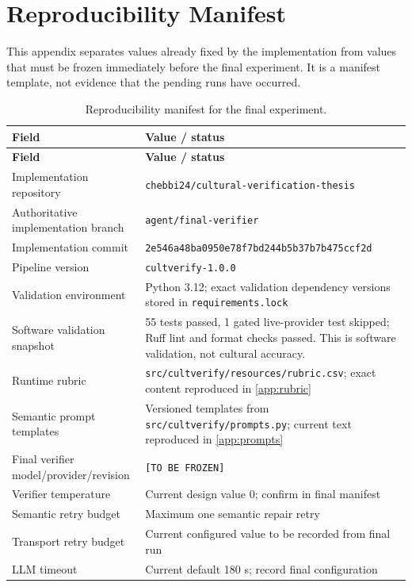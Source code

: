 \chapter{Reproducibility Manifest}
\label{app:repro}

This appendix separates values already fixed by the implementation from values that must be frozen immediately before the final experiment. It is a manifest template, not evidence that the pending runs have occurred.

\begin{longtable}{p{4.6cm}p{9.0cm}}
\caption{Reproducibility manifest for the final experiment.}\label{tab:repro-manifest}\\
\toprule
\textbf{Field} & \textbf{Value / status} \\
\midrule
\endfirsthead
\toprule
\textbf{Field} & \textbf{Value / status} \\
\midrule
\endhead
Implementation repository & \texttt{chebbi24/cultural-verification-thesis} \\
Authoritative implementation branch & \texttt{agent/final-verifier} \\
Implementation commit & \texttt{2e546a48ba0950e78f7bd244b5b37b7b475ccf2d} \\
Pipeline version & \texttt{cultverify-1.0.0} \\
Validation environment & Python 3.12; exact validation dependency versions stored in \texttt{requirements.lock} \\
Software validation snapshot & 55 tests passed, 1 gated live-provider test skipped; Ruff lint and format checks passed. This is software validation, not cultural accuracy. \\
Runtime rubric & \texttt{src/cultverify/resources/rubric.csv}; exact content reproduced in \cref{app:rubric} \\
Semantic prompt templates & Versioned templates from \texttt{src/cultverify/prompts.py}; current text reproduced in \cref{app:prompts} \\
Final verifier model/provider/revision & \texttt{[TO BE FROZEN]} \\
Verifier temperature & Current design value 0; confirm in final manifest \\
Semantic retry budget & Maximum one semantic repair retry \\
Transport retry budget & Current configured value to be recorded from final run \\
LLM timeout & Current default 180 s; record final configuration \\

\end{longtable}
